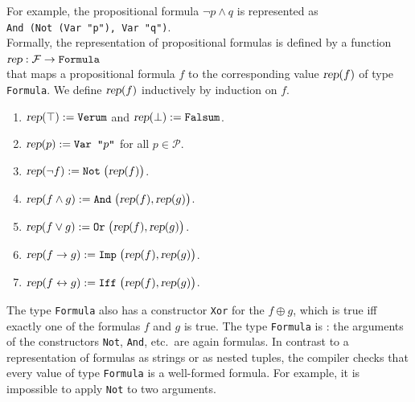 \noindent
For example, the propositional formula $\neg p \wedge q$ is represented as
\\[0.2cm]
\hspace*{1.3cm}
\texttt{And (Not (Var "p"), Var "q")}.
\\[0.2cm]
Formally, the representation of propositional formulas is defined by a function 
\\[0.2cm]
\hspace*{1.3cm}
$\textsl{rep}: \mathcal{F} \rightarrow \texttt{Formula}$
\\[0.2cm]
that maps a propositional formula $f$ to the corresponding value 
$\textsl{rep}(f)$ of type \texttt{Formula}.  We define $\textsl{rep}(f)$ inductively by induction on $f$.
\begin{enumerate}
\item $\textsl{rep}(\top) := \texttt{Verum}$ \quad and \quad $\textsl{rep}(\bot) := \texttt{Falsum}$.
\item $\textsl{rep}(p) := \texttt{Var "$p$"}$ \quad for all $p \in \mathcal{P}$.
\item $\textsl{rep}(\neg f) := \texttt{Not}\;\bigl(\textsl{rep}(f)\bigr)$.
\item $\textsl{rep}(f \wedge g) := \texttt{And}\;\bigl(\textsl{rep}(f), \textsl{rep}(g)\bigr)$.
\item $\textsl{rep}(f \vee g) := \texttt{Or}\;\bigl(\textsl{rep}(f), \textsl{rep}(g)\bigr)$.
\item $\textsl{rep}(f \rightarrow g) := \texttt{Imp}\;\bigl(\textsl{rep}(f), \textsl{rep}(g)\bigr)$.
\item $\textsl{rep}(f \leftrightarrow g) := \texttt{Iff}\;\bigl(\textsl{rep}(f), \textsl{rep}(g)\bigr)$.
\end{enumerate}
The type \texttt{Formula} also has a constructor \texttt{Xor} for the  $f \oplus g$, which is
true iff exactly one of the formulas $f$ and $g$ is true.
The type \texttt{Formula} is : the arguments of the constructors \texttt{Not}, \texttt{And},
etc.~are again formulas.  In contrast to a representation of formulas as strings or as nested tuples, the
\Fsharp{} compiler checks that every value of type \texttt{Formula} is a well-formed formula.  For example, it is
impossible to apply \texttt{Not} to two arguments.

